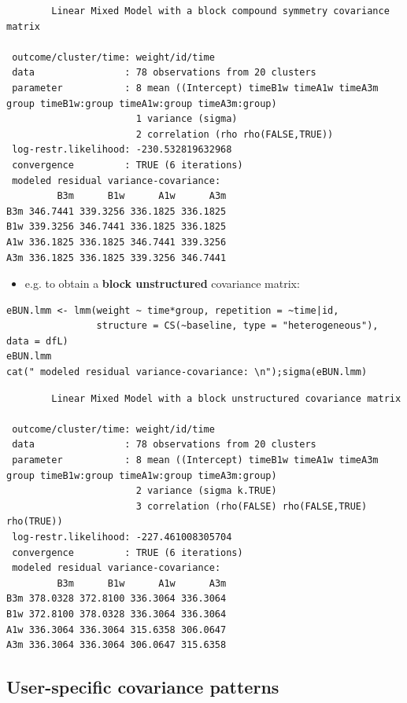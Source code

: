 \documentclass[12pt]{article}
\begin{document}
\begin{verbatim}
		Linear Mixed Model with a block compound symmetry covariance matrix 

 outcome/cluster/time: weight/id/time 
 data                : 78 observations from 20 clusters 
 parameter           : 8 mean ((Intercept) timeB1w timeA1w timeA3m group timeB1w:group timeA1w:group timeA3m:group) 
                       1 variance (sigma) 
                       2 correlation (rho rho(FALSE,TRUE)) 
 log-restr.likelihood: -230.532819632968 
 convergence         : TRUE (6 iterations)
 modeled residual variance-covariance: 
         B3m      B1w      A1w      A3m
B3m 346.7441 339.3256 336.1825 336.1825
B1w 339.3256 346.7441 336.1825 336.1825
A1w 336.1825 336.1825 346.7441 339.3256
A3m 336.1825 336.1825 339.3256 346.7441
\end{verbatim}

\begin{itemize}
\item e.g. to obtain a \textbf{block unstructured} covariance matrix:
\end{itemize}
\lstset{language=r,label= ,caption= ,captionpos=b,numbers=none}
\begin{lstlisting}
eBUN.lmm <- lmm(weight ~ time*group, repetition = ~time|id,
                structure = CS(~baseline, type = "heterogeneous"), data = dfL)
eBUN.lmm
cat(" modeled residual variance-covariance: \n");sigma(eBUN.lmm)
\end{lstlisting}

\begin{verbatim}
		Linear Mixed Model with a block unstructured covariance matrix 

 outcome/cluster/time: weight/id/time 
 data                : 78 observations from 20 clusters 
 parameter           : 8 mean ((Intercept) timeB1w timeA1w timeA3m group timeB1w:group timeA1w:group timeA3m:group) 
                       2 variance (sigma k.TRUE) 
                       3 correlation (rho(FALSE) rho(FALSE,TRUE) rho(TRUE)) 
 log-restr.likelihood: -227.461008305704 
 convergence         : TRUE (6 iterations)
 modeled residual variance-covariance: 
         B3m      B1w      A1w      A3m
B3m 378.0328 372.8100 336.3064 336.3064
B1w 372.8100 378.0328 336.3064 336.3064
A1w 336.3064 336.3064 315.6358 306.0647
A3m 336.3064 336.3064 306.0647 315.6358
\end{verbatim}

\clearpage

\subsection{User-specific covariance patterns}
\label{sec:org2ea98ef}
\end{document}
